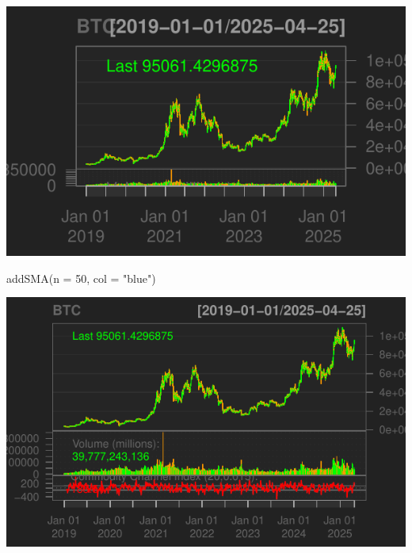 \documentclass[]{tufte-handout}
\newenvironment{Shaded}{}{}
\newcommand{\AttributeTok}[1]{\textcolor[rgb]{0.49,0.56,0.16}{#1}}
\newcommand{\DecValTok}[1]{\textcolor[rgb]{0.25,0.63,0.44}{#1}}
\newcommand{\FunctionTok}[1]{\textcolor[rgb]{0.02,0.16,0.49}{#1}}
\newcommand{\NormalTok}[1]{#1}
\newcommand{\OtherTok}[1]{\textcolor[rgb]{0.00,0.44,0.13}{#1}}
\newcommand{\SpecialCharTok}[1]{\textcolor[rgb]{0.25,0.44,0.63}{#1}}
\newcommand{\StringTok}[1]{\textcolor[rgb]{0.25,0.44,0.63}{#1}}
\begin{document}
\begin{Shaded}
\end{Shaded}

\includegraphics{cripto_update_files/figure-latex/unnamed-chunk-11-1}

\begin{Shaded}
\begin{Highlighting}[]
\FunctionTok{addSMA}\NormalTok{(}\AttributeTok{n =} \DecValTok{50}\NormalTok{, }\AttributeTok{col =} \StringTok{"blue"}\NormalTok{)}
\end{Highlighting}
\end{Shaded}

\includegraphics{cripto_update_files/figure-latex/unnamed-chunk-11-2}
\end{document}
